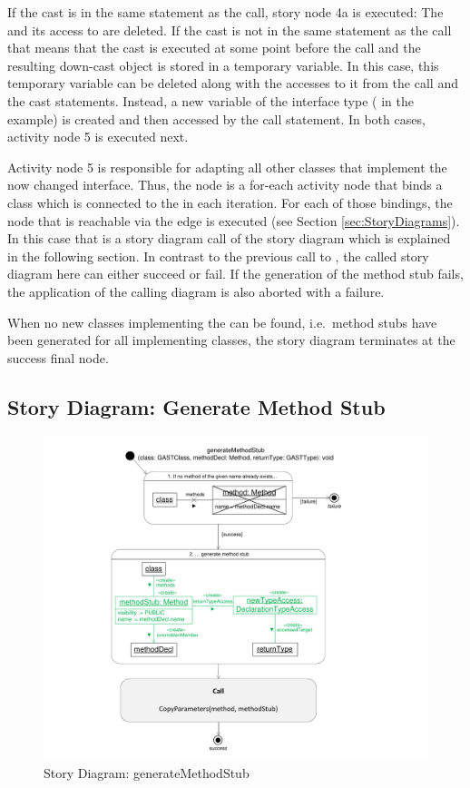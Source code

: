 If the cast is in the same statement as the call, story node 4a is executed: The  and its access to  are deleted. If the cast is not in the same statement as the call that means that the cast is executed at some point before the call and the resulting down-cast object is stored in a temporary variable. In this case, this temporary variable can be deleted along with the accesses to it from the call and the cast statements. Instead, a new variable of the interface type ( in the example) is created and then accessed by the call statement. In both cases, activity node 5 is executed next.

Activity node 5 is responsible for adapting all other classes that implement the now changed interface. Thus, the node is a for-each activity node that binds a class which is connected to the  in each iteration. For each of those bindings, the node that is reachable via the  edge is executed (see Section \ref{sec:StoryDiagrams}). In this case that is a story diagram call of the story diagram  which is explained in the following section. In contrast to the previous call to , the called story diagram here can either succeed or fail. If the generation of the method stub fails, the application of the calling diagram is also aborted with a failure.

When no new classes implementing the  can be found, i.e.\ method stubs have been generated for all implementing classes, the story diagram terminates at the success final node.

\subsection{Story Diagram: Generate Method Stub}

\begin{figure}[hbtp]
\centering
\includegraphics[width=0.9\linewidth]{./figures/SDGenerateMethodStub}
\caption{Story Diagram: generateMethodStub}
\label{fig:SDGenerateMethodStub}
\end{figure}

